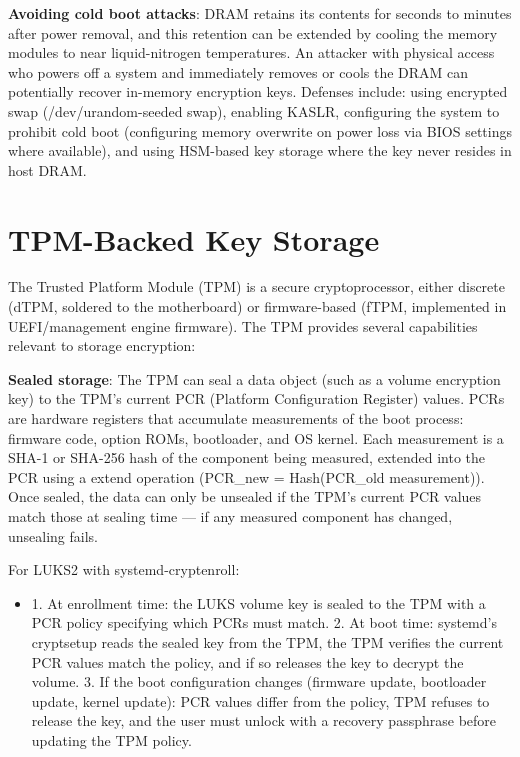 \textbf{Avoiding cold boot attacks}: DRAM retains its contents for seconds to minutes after power removal, and this retention can be extended by cooling the memory modules to near liquid-nitrogen temperatures. An attacker with physical access who powers off a system and immediately removes or cools the DRAM can potentially recover in-memory encryption keys. Defenses include: using encrypted swap (/dev/urandom-seeded swap), enabling KASLR, configuring the system to prohibit cold boot (configuring memory overwrite on power loss via BIOS settings where available), and using HSM-based key storage where the key never resides in host DRAM.

\section{TPM-Backed Key Storage}
The Trusted Platform Module (TPM) is a secure cryptoprocessor, either discrete (dTPM, soldered to the motherboard) or firmware-based (fTPM, implemented in UEFI/management engine firmware). The TPM provides several capabilities relevant to storage encryption:

\textbf{Sealed storage}: The TPM can seal a data object (such as a volume encryption key) to the TPM's current PCR (Platform Configuration Register) values. PCRs are hardware registers that accumulate measurements of the boot process: firmware code, option ROMs, bootloader, and OS kernel. Each measurement is a SHA-1 or SHA-256 hash of the component being measured, extended into the PCR using a extend operation (PCR\_new = Hash(PCR\_old \textbar\textbar{} measurement)). Once sealed, the data can only be unsealed if the TPM's current PCR values match those at sealing time --- if any measured component has changed, unsealing fails.

For LUKS2 with systemd-cryptenroll:

\begin{itemize}
  \item 1. At enrollment time: the LUKS volume key is sealed to the TPM with a PCR policy specifying which PCRs must match.
2. At boot time: systemd's cryptsetup reads the sealed key from the TPM, the TPM verifies the current PCR values match the policy, and if so releases the key to decrypt the volume.
3. If the boot configuration changes (firmware update, bootloader update, kernel update): PCR values differ from the policy, TPM refuses to release the key, and the user must unlock with a recovery passphrase before updating the TPM policy.
\end{itemize}

